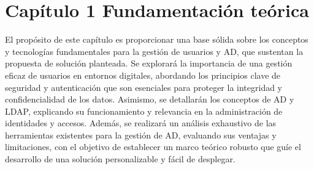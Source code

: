 \section{Capítulo 1 Fundamentación teórica}

El propósito de este capítulo es proporcionar una base sólida sobre los conceptos y tecnologías fundamentales para la gestión de usuarios y AD, que sustentan la propuesta de solución planteada. Se explorará la importancia de una gestión eficaz de usuarios en entornos digitales, abordando los principios clave de seguridad y autenticación que son esenciales para proteger la integridad y confidencialidad de los datos. Asimismo, se detallarán los conceptos de AD y LDAP, explicando su funcionamiento y relevancia en la administración de identidades y accesos. Además, se realizará un análisis exhaustivo de las herramientas existentes para la gestión de AD, evaluando sus ventajas y limitaciones, con el objetivo de establecer un marco teórico robusto que guíe el desarrollo de una solución personalizable y fácil de desplegar.





